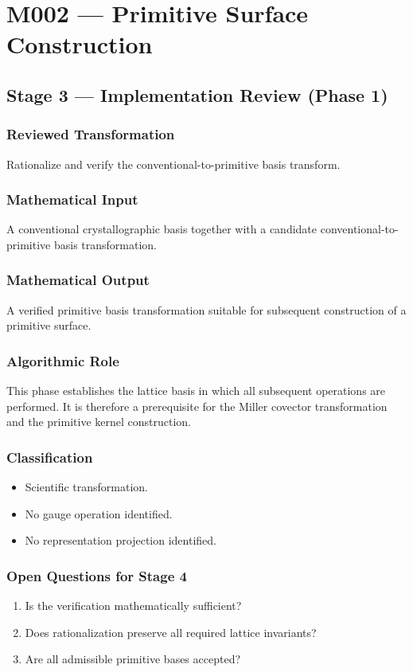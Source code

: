 
\chapter{M002 --- Primitive Surface Construction}

\section{Stage 3 --- Implementation Review (Phase 1)}

\subsection{Reviewed Transformation}

Rationalize and verify the conventional-to-primitive basis transform.

\subsection{Mathematical Input}

A conventional crystallographic basis together with a candidate
conventional-to-primitive basis transformation.

\subsection{Mathematical Output}

A verified primitive basis transformation suitable for subsequent
construction of a primitive surface.

\subsection{Algorithmic Role}

This phase establishes the lattice basis in which all subsequent
operations are performed. It is therefore a prerequisite for the Miller
covector transformation and the primitive kernel construction.

\subsection{Classification}

\begin{itemize}
\item Scientific transformation.
\item No gauge operation identified.
\item No representation projection identified.
\end{itemize}

\subsection{Open Questions for Stage 4}

\begin{enumerate}
\item Is the verification mathematically sufficient?
\item Does rationalization preserve all required lattice invariants?
\item Are all admissible primitive bases accepted?
\end{enumerate}
